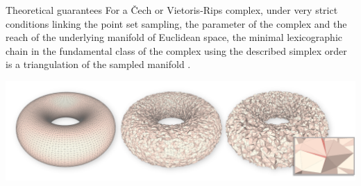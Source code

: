 \begin{frame}{Theoretical guarantees}
	\scriptsize
	For a Čech or Vietoris-Rips complex, under very strict conditions linking the point set sampling, the parameter of the complex and the reach of the underlying manifold of Euclidean space, the minimal lexicographic chain in the fundamental class of the complex using the described simplex order is a triangulation of the sampled manifold \cite{cohen-steiner_LexicographicOptimalChains_2019}.
	
	\includegraphics[width=\linewidth]{torus_3}	
\end{frame}